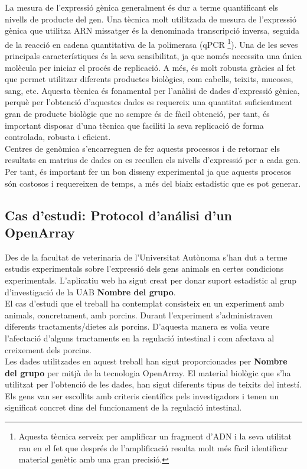 \documentclass[english]{article}
\begin{document}
La mesura de l'expressió gènica generalment és dur a terme quantificant els nivells de producte del gen. Una tècnica molt utilitzada de mesura de l'expressió gènica que utilitza ARN missatger és la denominada transcripció inversa, seguida de la reacció en cadena quantitativa de la polimerasa (qPCR \footnote{Aquesta tècnica serveix per amplificar un fragment d'ADN i la seva utilitat rau en el fet que després de l'amplificació resulta molt més fàcil identificar material genètic amb una gran precisió.}). Una de les seves principals característiques és la seva sensibilitat, ja que només necessita una única molècula per iniciar el procés de replicació. A més, és molt robusta gràcies al fet que permet utilitzar diferents productes biològics, com cabells, teixits, mucoses, sang, etc. Aquesta tècnica és fonamental per l'anàlisi de dades d'expressió gènica, perquè per l'obtenció d'aquestes dades es requereix una quantitat suficientment gran de producte biològic que no sempre és de fàcil obtenció, per tant, és important disposar d'una tècnica que faciliti la seva replicació de forma controlada, robusta i eficient.
\\

Centres de genòmica s'encarreguen de fer aquests processos i de retornar els resultats en matrius de dades on es recullen els nivells d'expressió per a cada gen. Per tant, és important fer un bon disseny experimental ja que aquests procesos són costosos i requereixen de temps, a més del biaix estadístic que es pot generar.


\subsection{Cas d'estudi: Protocol d'análisi d'un OpenArray}
Des de la facultat de veterinaria de l'Universitat Autònoma s'han dut a terme estudis experimentals sobre l'expressió dels gens animals en certes condicions experimentals. L'aplicatiu web ha sigut creat per donar suport estadístic al grup d'investigació de la UAB \textbf{Nombre del grupo}.
\\

El cas d'estudi que el treball ha contemplat consisteix en un experiment amb animals, concretament, amb porcins. Durant l'experiment s'administraven diferents tractaments/dietes als porcins. D'aquesta manera es volia veure l'afectació d'alguns tractaments en la regulació intestinal i com afectava al creixement dels porcins.
\\

Les dades utilitzades en aquest treball han sigut proporcionades per \textbf{Nombre del grupo} per mitjà de la tecnologia OpenArray. El material biològic que s'ha utilitzat per l'obtenció de les dades, han sigut diferents tipus de teixits del intestí. Els gens van ser escollits amb criteris científics pels investigadors i tenen un significat concret dins del funcionament de la regulació intestinal.
\\
\end{document}

